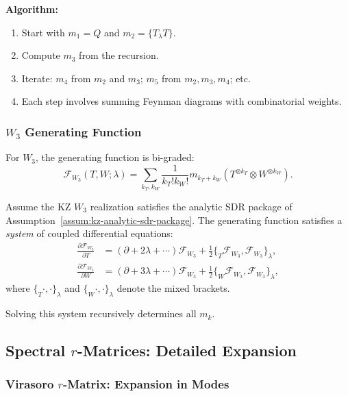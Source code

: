 \textbf{Algorithm:}
\begin{enumerate}
\item Start with $m_1 = Q$ and $m_2 = \{T_\lambda T\}$.
\item Compute $m_3$ from the recursion.
\item Iterate: $m_4$ from $m_2$ and $m_3$; $m_5$ from $m_2, m_3, m_4$; etc.
\item Each step involves summing Feynman diagrams with combinatorial weights.
\end{enumerate}

\subsubsection{$W_3$ Generating Function}

For $W_3$, the generating function is bi-graded:
\begin{equation}
\mathcal{F}_{W_3}(T, W; \lambda) = \sum_{k_T, k_W} \frac{1}{k_T! k_W!} m_{k_T + k_W}(T^{\otimes k_T} \otimes W^{\otimes k_W}).
\end{equation}

\begin{theorem}
Assume the KZ $W_3$ realization satisfies the analytic SDR package of
Assumption~\textup{\ref{assum:kz-analytic-sdr-package}}.
The generating function satisfies a \emph{system} of coupled differential equations:
\begin{align}
\frac{\partial \mathcal{F}_{W_3}}{\partial T} &= (\partial + 2\lambda + \cdots) \mathcal{F}_{W_3} + \frac{1}{2} \{_T \mathcal{F}_{W_3}, \mathcal{F}_{W_3}\}_\lambda,\\
\frac{\partial \mathcal{F}_{W_3}}{\partial W} &= (\partial + 3\lambda + \cdots) \mathcal{F}_{W_3} + \frac{1}{2} \{_W \mathcal{F}_{W_3}, \mathcal{F}_{W_3}\}_\lambda,
\end{align}
where $\{_T \cdot, \cdot \}_\lambda$ and $\{_W \cdot, \cdot \}_\lambda$ denote the mixed brackets.
\end{theorem}

Solving this system recursively determines all $m_k$.

\subsection{Spectral $r$-Matrices: Detailed Expansion}

\subsubsection{Virasoro $r$-Matrix: Expansion in Modes}

